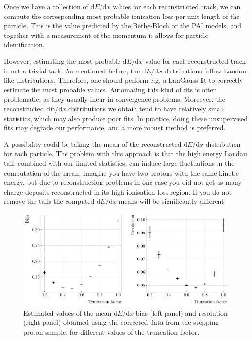 Once we have a collection of $\mathrm{d}E/\mathrm{d}x$ values for each reconstructed track, we can compute the corresponding most probable ionisation loss per unit length of the particle. This is the value predicted by the Bethe-Bloch or the PAI models, and together with a measurement of the momentum it allows for particle identification.

However, estimating the most probable $\mathrm{d}E/\mathrm{d}x$ value for each reconstructed track is not a trivial task. As mentioned before, the $\mathrm{d}E/\mathrm{d}x$ distributions follow Landau-like distributions. Therefore, one should perform e.g. a LanGauss fit to correctly estimate the most probable values. Automating this kind of fits is often problematic, as they usually incur in convergence problems. Moreover, the reconstructed $\mathrm{d}E/\mathrm{d}x$ distributions we obtain tend to have relatively small statistics, which may also produce poor fits. In practice, doing these unsupervised fits may degrade our performance, and a more robust method is preferred.

A possibility could be taking the mean of the reconstructed $\mathrm{d}E/\mathrm{d}x$ distribution for each particle. The problem with this approach is that the high energy Landau tail, combined with our limited statistics, can induce large fluctuations in the computation of the mean. Imagine you have two protons with the same kinetic energy, but due to reconstruction problems in one case you did not get as many charge deposits reconstructed in its high ionisation loss region. If you do not remove the tails the computed $\mathrm{d}E/\mathrm{d}x$ means will be significantly different.

\begin{figure}[t]
	\centering
	\includegraphics[width=.90\linewidth]{Images/GArSoft_PID/dEdx/reco_dEdx_truncation_opt.pdf}
	\caption[Estimated values of the mean $\mathrm{d}E/\mathrm{d}x$ bias and resolution for the stopping proton sample at different values of the truncation factor.]{Estimated values of the mean $\mathrm{d}E/\mathrm{d}x$ bias (left panel) and resolution (right panel) obtained using the corrected data from the stopping proton sample, for different values of the truncation factor.}
	\label{fig:energy_trucation_opt}
\end{figure}

